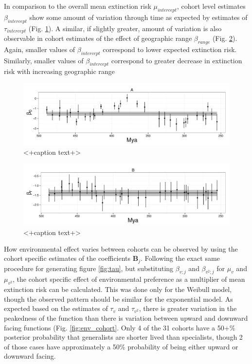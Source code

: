 \documentclass[12pt,letterpaper]{article}
\begin{document}
In comparison to the overall mean extinction risk \(\mu_{intercept}\), cohort level estimates \(\beta_{intercept}\) show some amount of variation through time as expected by estimates of \(\tau_{intercept}\) (Fig. \ref{fig:cohort_intercept}). A similar, if slightly greater, amount of variation is also observable in cohort estimates of the effect of geographic range \(\beta_{range}\) (Fig. \ref{fig:cohort_range}). Again, smaller values of \(\beta_{intercept}\) correspond to lower expected extinction risk. Similarly, smaller values of \(\beta_{intercept}\) correspond to greater decrease in extinction risk with increasing geographic range 
\begin{figure}[ht]
  \centering
  \includegraphics[height = 0.5\textheight,width=\textwidth,keepaspectratio=true]{figure/intercept_cohort}
  \caption{<+caption text+>}
  \label{fig:cohort_intercept}
\end{figure}

\begin{figure}[ht]
  \centering
  \includegraphics[height = 0.5\textheight,width=\textwidth,keepaspectratio=true]{figure/range_cohort}
  \caption{<+caption text+>}
  \label{fig:cohort_range}
\end{figure}

How environmental effect varies between cohorts can be observed by using the cohort specific estimates of the coefficients \(\mathbf{B}_{j}\). Following the exact same procedure for generating figure \ref{fig:tau}, but substituting \(\beta_{v; j}\) and \(\beta_{v^{2}; j}\) for \(\mu_{v}\) and \(\mu_{v^{2}}\), the cohort specific effect of environmental preference as a multiplier of mean extinction risk can be calculated. This was done only for the Weibull model, though the observed pattern should be similar for the exponential model. As expected based on the estimates of \(\tau_{v}\) and \(\tau_{v^{2}}\), there is greater variation in the peakedness of the function than there is variation between upward and downward facing functions (Fig. \ref{fig:env_cohort}. Only 4 of the 31 cohorts have a 50+\% posterior probability that generalists are shorter lived than specialists, though 2 of those cases have approximately a 50\% probability of being either upward or downward facing.
\end{document}
